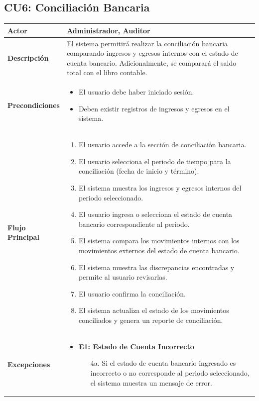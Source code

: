 \documentclass{article}
\begin{document}
\subsection{CU6: Conciliación Bancaria}
\begin{longtable}{|l|p{10cm}|}
\hline
\textbf{Actor} & Administrador, Auditor \\ \hline
\textbf{Descripción} & El sistema permitirá realizar la conciliación bancaria comparando ingresos y egresos internos con el estado de cuenta bancario. Adicionalmente, se comparará el saldo total con el libro contable. \\ \hline
\textbf{Precondiciones} & 
\begin{itemize}
    \item El usuario debe haber iniciado sesión.
    \item Deben existir registros de ingresos y egresos en el sistema.
\end{itemize} \\ \hline
\textbf{Flujo Principal} & 
\begin{enumerate}
    \item El usuario accede a la sección de conciliación bancaria.
    \item El usuario selecciona el periodo de tiempo para la conciliación (fecha de inicio y término).
    \item El sistema muestra los ingresos y egresos internos del periodo seleccionado.
    \item El usuario ingresa o selecciona el estado de cuenta bancario correspondiente al periodo.
    \item El sistema compara los movimientos internos con los movimientos externos del estado de cuenta bancario.
    \item El sistema muestra las discrepancias encontradas y permite al usuario revisarlas.
    \item El usuario confirma la conciliación.
    \item El sistema actualiza el estado de los movimientos conciliados y genera un reporte de conciliación.
\end{enumerate} \\ \hline
\textbf{Excepciones} & 
\begin{itemize}
    \item \textbf{E1: Estado de Cuenta Incorrecto}
    \begin{enumerate}
        \item[4a.] Si el estado de cuenta bancario ingresado es incorrecto o no corresponde al periodo seleccionado, el sistema muestra un mensaje de error.

\end{enumerate}
\end{itemize}
\end{longtable}
\end{document}
